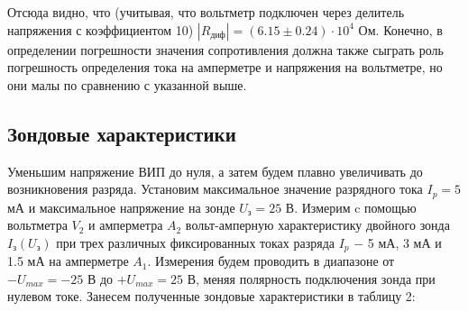 \documentclass[a4paper,12pt]{article} %
\begin{document}
\hfill \break Отсюда видно, что (учитывая, что вольтметр подключен через делитель напряжения с коэффициентом 10) $|R_\text{диф}| = (6.15 \pm 0.24) \cdot 10^4$ Ом. Конечно, в определении погрешности значения сопротивления должна также сыграть роль погрешность определения тока на амперметре и напряжения на вольтметре, но они малы по сравнению с указанной выше.

\subsection{Зондовые характеристики}

\hfill \break Уменьшим напряжение ВИП до нуля, а затем будем плавно увеличивать до возникновения разряда. Установим максимальное значение разрядного тока $I_{p} = 5$ мА и максимальное напряжение на зонде $U_\text{з} = 25$ В. Измерим c помощью вольтметра $V_{2}$ и амперметра $A_{2}$ вольт-амперную характеристику двойного зонда $I_\text{з} (U_\text{з})$ при трех различных фиксированных токах разряда $I_{p}$ $-$ 5 мА, 3 мА и 1.5 мА на амперметре $A_{1}$. Измерения будем проводить в диапазоне от $-U_{max} = -25$ В до $+U_{max} = 25$ В, меняя полярность подключения зонда при нулевом токе. Занесем полученные зондовые характеристики в таблицу 2:
\end{document}
